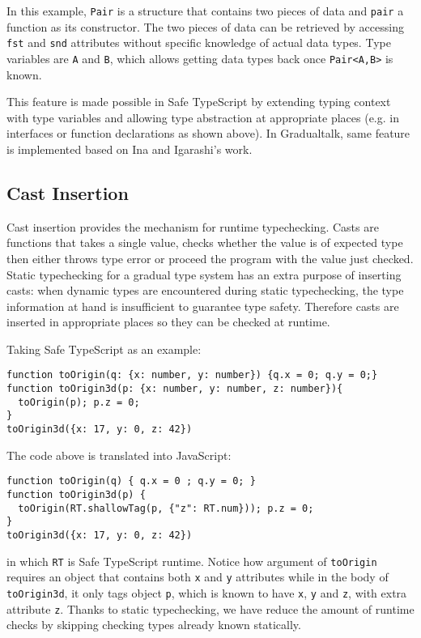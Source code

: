 In this example, \texttt{Pair} is a structure that contains two pieces of data and
\texttt{pair} a function as its constructor.
The two pieces of data can be retrieved
by accessing \texttt{fst} and \texttt{snd} attributes without specific knowledge
of actual data types. Type variables are \texttt{A} and \texttt{B}, which
allows getting data types back once \texttt{Pair<A,B>} is known.

This feature is made possible in Safe TypeScript by extending typing context with type variables
and allowing type abstraction at appropriate places
(e.g. in interfaces or function declarations as shown above).
In Gradualtalk, same feature is implemented based on
Ina and Igarashi's work\cite{ina2011gradual}.

\subsection{Cast Insertion}

Cast insertion provides the mechanism for runtime typechecking.
Casts are functions that takes a single value, checks whether the value is of expected type
then either throws type error or proceed the program with the value just checked.
Static typechecking for a gradual type system has an extra purpose of inserting casts:
when dynamic types are encountered during static typechecking, the type information
at hand is insufficient to guarantee type safety. Therefore casts are inserted
in appropriate places so they can be checked at runtime.

Taking Safe TypeScript as an example:

\begin{verbatim}
function toOrigin(q: {x: number, y: number}) {q.x = 0; q.y = 0;}
function toOrigin3d(p: {x: number, y: number, z: number}){
  toOrigin(p); p.z = 0;
}
toOrigin3d({x: 17, y: 0, z: 42})
\end{verbatim}

The code above is translated into JavaScript:

\begin{verbatim}
function toOrigin(q) { q.x = 0 ; q.y = 0; }
function toOrigin3d(p) {
  toOrigin(RT.shallowTag(p, {"z": RT.num})); p.z = 0;
}
toOrigin3d({x: 17, y: 0, z: 42})
\end{verbatim}

in which \texttt{RT} is Safe TypeScript runtime.
Notice how argument of \texttt{toOrigin} requires an object that contains
both \texttt{x} and \texttt{y} attributes while in the body of
\texttt{toOrigin3d}, it only tags object \texttt{p},
which is known to have \texttt{x}, \texttt{y} and  \texttt{z}, with extra attribute \texttt{z}.
Thanks to static typechecking, we have reduce the amount of runtime checks
by skipping checking types already known statically.

